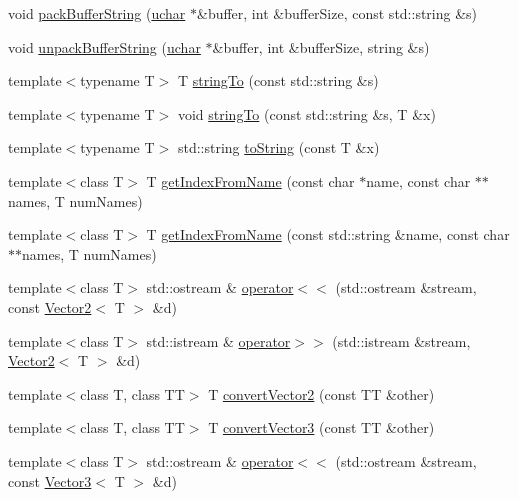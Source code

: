 \begin{CompactItemize}
\item 
void \hyperlink{namespace_j_g_t_l_10113799bfd8b9221337e9eb1db3e2ec}{pack\-Buffer\-String} (\hyperlink{namespace_j_g_t_l_16d84383f2c4546df4385d012e588239}{uchar} $\ast$\&buffer, int \&buffer\-Size, const std::string \&s)
\item 
void \hyperlink{namespace_j_g_t_l_34dd4000293ca4b9c6fff41b43614e3c}{unpack\-Buffer\-String} (\hyperlink{namespace_j_g_t_l_16d84383f2c4546df4385d012e588239}{uchar} $\ast$\&buffer, int \&buffer\-Size, string \&s)
\item 
template$<$typename T$>$ T \hyperlink{namespace_j_g_t_l_5509bac1c7547b458b0e3119a90122e0}{string\-To} (const std::string \&s)
\item 
template$<$typename T$>$ void \hyperlink{namespace_j_g_t_l_7c81dd2e47a577070ab612b1e8dfe8b6}{string\-To} (const std::string \&s, T \&x)
\item 
template$<$typename T$>$ std::string \hyperlink{namespace_j_g_t_l_57b3e2e62e4a4d1b28eed30da07f644b}{to\-String} (const T \&x)
\item 
template$<$class T$>$ T \hyperlink{namespace_j_g_t_l_314e435c010086e0452f20d100df3816}{get\-Index\-From\-Name} (const char $\ast$name, const char $\ast$$\ast$names, T num\-Names)
\item 
template$<$class T$>$ T \hyperlink{namespace_j_g_t_l_9cf5cbff66a1b2b4b4befb08e49f7531}{get\-Index\-From\-Name} (const std::string \&name, const char $\ast$$\ast$names, T num\-Names)
\item 
template$<$class T$>$ std::ostream \& \hyperlink{namespace_j_g_t_l_13f77c42055402468759f015db010146}{operator$<$$<$} (std::ostream \&stream, const \hyperlink{class_j_g_t_l_1_1_vector2}{Vector2}$<$ T $>$ \&d)
\item 
template$<$class T$>$ std::istream \& \hyperlink{namespace_j_g_t_l_93f207a066e245b114cc7e00d08093b3}{operator$>$$>$} (std::istream \&stream, \hyperlink{class_j_g_t_l_1_1_vector2}{Vector2}$<$ T $>$ \&d)
\item 
template$<$class T, class TT$>$ T \hyperlink{namespace_j_g_t_l_9e84b24f220fc9ec5a797ba7f9ad5f8e}{convert\-Vector2} (const TT \&other)
\item 
template$<$class T, class TT$>$ T \hyperlink{namespace_j_g_t_l_879d8173837a2120b87f37c81f03dab3}{convert\-Vector3} (const TT \&other)
\item 
template$<$class T$>$ std::ostream \& \hyperlink{namespace_j_g_t_l_36eb9f0b0f3e2989330d3e2019cbeed4}{operator$<$$<$} (std::ostream \&stream, const \hyperlink{class_j_g_t_l_1_1_vector3}{Vector3}$<$ T $>$ \&d)

\end{CompactItemize}
